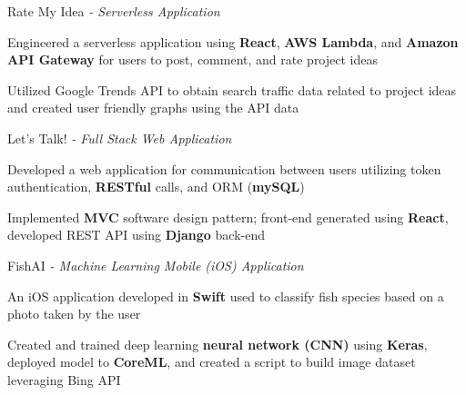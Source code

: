 \begin{siderulesProj}
\par\addvspace{-1.2ex}
\begin{cventriesproject}
  \cventryproject
  {Rate My Idea  \hspace{0.15em}\bodyfontlight\itshape{- Serverless Application}}
  {
    \begin{cvskillitems}
      \item {Engineered a serverless application using \textbf{React}, \textbf{AWS Lambda}, and \textbf{Amazon API Gateway} for users to post, comment, and rate project ideas }
      \item {Utilized Google Trends API to obtain search traffic data related to project ideas and created user friendly graphs using the API data}
    \end{cvskillitems}
  }
  \cventryproject
    {Let's Talk!  \hspace{0.15em}\bodyfontlight\itshape{- Full Stack Web Application}}
    {
      \begin{cvskillitems}
        \item {Developed a web application for communication between users utilizing token authentication, \textbf{RESTful} calls, and ORM (\textbf{mySQL})}
        \item {Implemented \textbf{MVC} software design pattern; front-end generated using \textbf{React}, developed REST API using \textbf{Django} back-end}
      \end{cvskillitems}
    }
  \cventryproject
    {FishAI  \hspace{0.15em}\bodyfontlight\itshape{- Machine Learning Mobile (iOS) Application}}
    {
      \begin{cvskillitems}
        \item {An iOS application developed in \textbf{Swift} used to classify fish species based on a photo taken by the user}
        \item {Created and trained deep learning \textbf{neural network (CNN)} using \textbf{Keras}, deployed model to \textbf{CoreML}, and created a script to build image dataset leveraging Bing API}
      \end{cvskillitems}
    }
\end{cventriesproject}
\end{siderulesProj}
